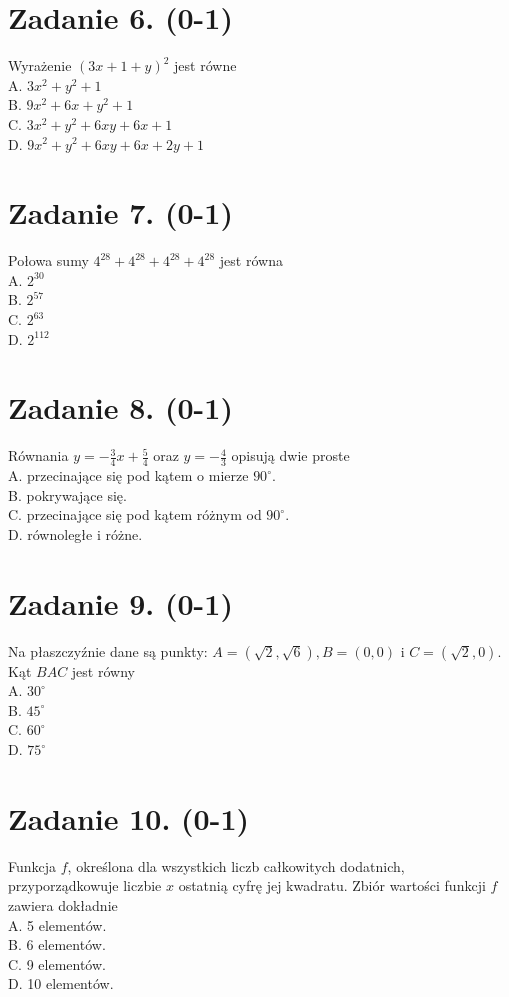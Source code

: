 \documentclass[10pt]{article}
\begin{document}
\section*{Zadanie 6. (0-1)}
Wyrażenie \((3 x+1+y)^{2}\) jest równe\\
A. \(3 x^{2}+y^{2}+1\)\\
B. \(9 x^{2}+6 x+y^{2}+1\)\\
C. \(3 x^{2}+y^{2}+6 x y+6 x+1\)\\
D. \(9 x^{2}+y^{2}+6 x y+6 x+2 y+1\)

\section*{Zadanie 7. (0-1)}
Połowa sumy \(4^{28}+4^{28}+4^{28}+4^{28}\) jest równa\\
A. \(2^{30}\)\\
B. \(2^{57}\)\\
C. \(2^{63}\)\\
D. \(2^{112}\)

\section*{Zadanie 8. (0-1)}
Równania \(y=-\frac{3}{4} x+\frac{5}{4}\) oraz \(y=-\frac{4}{3}\) opisują dwie proste\\
A. przecinające się pod kątem o mierze \(90^{\circ}\).\\
B. pokrywające się.\\
C. przecinające się pod kątem różnym od \(90^{\circ}\).\\
D. równoległe i różne.

\section*{Zadanie 9. (0-1)}
Na płaszczyźnie dane są punkty: \(A=(\sqrt{2}, \sqrt{6}), B=(0,0)\) i \(C=(\sqrt{2}, 0)\). Kąt \(B A C\) jest równy\\
A. \(30^{\circ}\)\\
B. \(45^{\circ}\)\\
C. \(60^{\circ}\)\\
D. \(75^{\circ}\)

\section*{Zadanie 10. (0-1)}
Funkcja \(f\), określona dla wszystkich liczb całkowitych dodatnich, przyporządkowuje liczbie \(x\) ostatnią cyfrę jej kwadratu. Zbiór wartości funkcji \(f\) zawiera dokładnie\\
A. 5 elementów.\\
B. 6 elementów.\\
C. 9 elementów.\\
D. 10 elementów.
\end{document}
